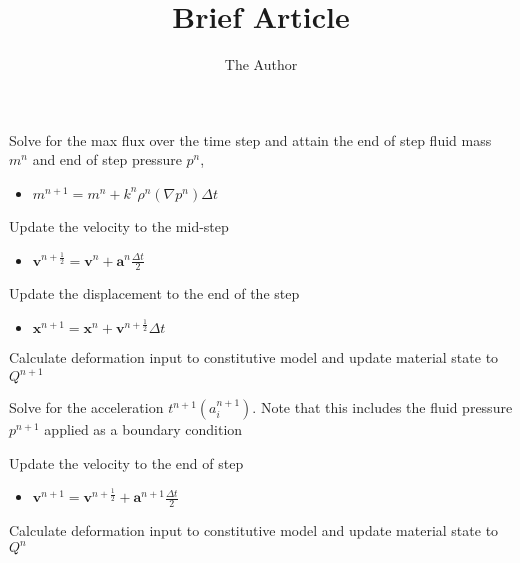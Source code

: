 \documentclass[11pt, oneside]{article}   	%
\title{Brief Article}
\author{The Author}
\begin{document}
\maketitle

\begin{algorithm}
\begin{algorithmic}[1]
\State Solve for the max flux over the time step and attain the end of step fluid mass $m^{n}$ and end of step 
pressure $p^{n}$, 
\begin{itemize}
\item $m^{n+1} = m^{n} + k^{n} \rho^{n} \left( \nabla p^{n} \right) \Delta t$
\end{itemize}

\State Update the velocity to the mid-step 
\begin{itemize}
\item $\mathbf{v}^{n+\frac{1}{2}} = \mathbf{v}^{n} + \mathbf{a}^{n} \frac{\Delta t}{2}$
\end{itemize}

\State Update the displacement to the end of the step
\begin{itemize}
\item $\mathbf{x}^{n+1} = \mathbf{x}^{n} + \mathbf{v}^{n+\frac{1}{2}} \Delta t$
\end{itemize}

\State Calculate deformation input to constitutive model and update material state to $Q^{n+1}$

\State Solve for the acceleration $t^{n+1} \left( a_i^{n+1} \right)$. Note that this includes the fluid 
pressure $p^{n+1}$ applied as a boundary condition

\State Update the velocity to the end of step 

\begin{itemize}
\item $\mathbf{v}^{n+1} = \mathbf{v}^{n+\frac{1}{2}} + \mathbf{a}^{n+1} \frac{\Delta t}{2} $ 
\end{itemize}


\EndProcedure
\end{algorithmic}
\caption{Calculate deformation input to constitutive model and update material state to $Q^{n}$}
\end{algorithm}
\end{document}
